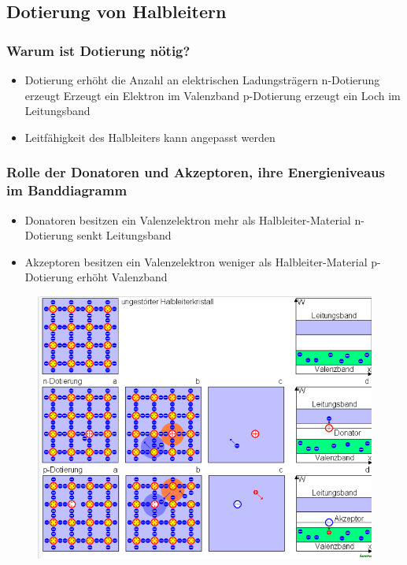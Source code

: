 \subsection{Dotierung von Halbleitern}
\subsubsection*{Warum ist Dotierung nötig?}
\begin{itemize}
    \item Dotierung erhöht die Anzahl an elektrischen Ladungsträgern
        \to n-Dotierung erzeugt Erzeugt ein Elektron im Valenzband 
        \to p-Dotierung erzeugt ein Loch im Leitungsband 
    \item Leitfähigkeit des Halbleiters kann angepasst werden
\end{itemize}

\subsubsection*{Rolle der Donatoren und Akzeptoren, ihre Energieniveaus im Banddiagramm}
\begin{itemize}
    \item Donatoren besitzen ein Valenzelektron mehr als Halbleiter-Material
        \to n-Dotierung
        \to senkt Leitungsband
    \item Akzeptoren besitzen ein Valenzelektron weniger als Halbleiter-Material
        \to p-Dotierung 
        \to erhöht Valenzband
\end{itemize}
\begin{figure}[H]
    \centering
    \includegraphics*[scale=0.8]{pictures/Dotierung.png}
\end{figure}

